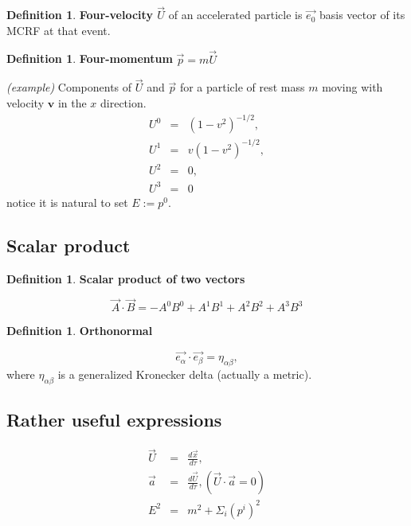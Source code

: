 \documentclass{article}
\theoremstyle{plain}
\theoremstyle{definition}
\newtheorem{defn}[thm]{Definition} %
\begin{document}
\begin{defn} \textbf{Four-velocity $\vec{U}$} of an accelerated particle is $\vec{e_0}$ basis vector of its MCRF at that event. \end{defn}

\begin{defn} \textbf{Four-momentum} $\vec{p} = m \vec{U}$ \end{defn}

\noindent\textit{(example)} Components of $\vec{U}$ and $\vec{p}$ for a particle of rest mass $m$ moving with velocity $\mathbf{v}$ in the $x$ direction.
\begin{eqnarray}\nonumber
    U^0 & = & (1-v^2)^{-1/2},\\\nonumber
    U^1 & = & v(1-v^2)^{-1/2},\\\nonumber 
    U^2 & = & 0,\\\nonumber
    U^3 & = & 0
\end{eqnarray}
notice it is natural to set $E := p^0$.\\

\subsection{Scalar product}
\begin{defn} \textbf{Scalar product of two vectors} \end{defn}
\begin{equation}
    \vec{A}\cdot\vec{B} = -A^0B^0+A^1B^1+A^2B^2+A^3B^3
\end{equation}

\begin{defn} \textbf{Orthonormal} \end{defn}
\begin{equation}
    \vec{e_\alpha} \cdot \vec{e_\beta} = \eta_{\alpha\beta},
\end{equation}
where $\eta_{\alpha\beta}$ is a generalized Kronecker delta (actually a metric).

\subsection{Rather useful expressions}
\begin{eqnarray}
    \vec{U} & = & \frac{d\vec{x}}{d\tau},\\
    \vec{a} & = & \frac{d\vec{U}}{d\tau}, (\vec{U}\cdot\vec{a} = 0)\\
    E^2 & = & m^2 + \Sigma_i (p^i)^2
\end{eqnarray}
\end{document}
